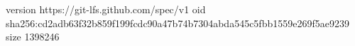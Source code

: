version https://git-lfs.github.com/spec/v1
oid sha256:cd2adb63f32b859f199fcdc90a47b74b7304abda545c5fbb1559e269f5ae9239
size 1398246
